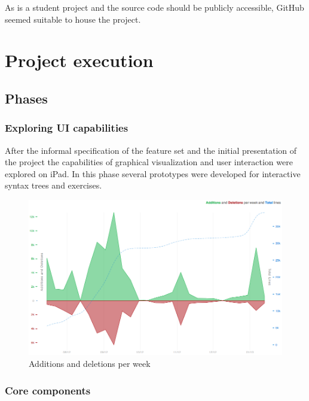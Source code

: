 As \Nyaya is a student project and the source code should be publicly accessible,
GitHub seemed suitable to house the project.

\section{Project execution}



\subsection{Phases}

\subsubsection{Exploring UI capabilities}

After the informal specification of the feature set and the initial presentation of the project
the capabilities of graphical visualization and  user interaction were explored on iPad.
In this phase several prototypes were developed for interactive syntax trees and exercises.

\begin{figure}[htbp]
\begin{center}
\includegraphics[scale=0.3]{pics/work.png}
\caption{Additions and deletions per week}
\label{fig:GitHubGraphAddDel}
\end{center}
\end{figure}

\subsubsection{Core components}


